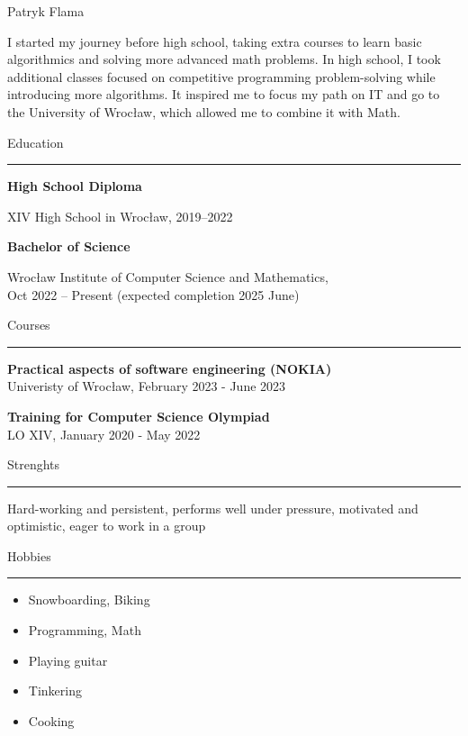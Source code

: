 \documentclass{letter}
\begin{document}
\hfill
\begin{minipage}[t]{0.60\textwidth}
\setlength{\baselineskip}{1.5\baselineskip}
\vspace{0.8cm}
{\huge Patryk Flama}

\vspace{0.3cm}

\begin{spacing}{1.125}
\small 
I started my journey before high school, taking extra courses to learn basic algorithmics and solving more advanced math problems. In high school, I took additional classes focused on competitive programming problem-solving while introducing more algorithms. It inspired me to focus my path on IT and go to the University of Wrocław, which allowed me to combine it with Math.
\end{spacing}

\vspace{0.3cm}

{\large Education}
\rule{\linewidth}{0.4pt}

{\large \textbf{High School Diploma}}

{\small XIV High School in Wrocław, 2019--2022}

{\large \textbf{Bachelor of Science}}

{\small Wrocław Institute of Computer Science and Mathematics, \\
Oct 2022 -- Present (expected completion 2025 June)}

\vspace{0.3cm}

{\large Courses}
\rule{\linewidth}{0.4pt}

\textbf{Practical aspects of software engineering (NOKIA)} \\
{\small Univeristy of Wrocław, February 2023 - June 2023}

\textbf{Training for Computer Science Olympiad} \\
{\small  LO XIV, January 2020 - May 2022}

\vspace{0.3cm}

{\large Strenghts}
\rule{\linewidth}{0.4pt}
Hard-working and persistent, performs well under pressure, motivated and optimistic, eager to work in a group

\vspace{0.3cm}

{\large Hobbies}
\rule{\linewidth}{0.4pt}

\begin{itemize}
\itemsep0em 
    \item Snowboarding, Biking
    \item Programming, Math
    \item Playing guitar
    \item Tinkering
    \item Cooking
\end{itemize}


\end{minipage}
\end{document}
